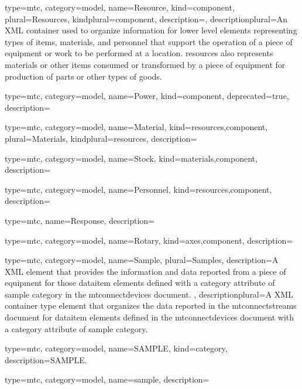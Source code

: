 {
  type=mtc,
  category=model,
  name={Resource},
  kind={component},
  plural={Resources},
  kindplural={component},
  description={},
  descriptionplural={An XML container used to organize information for \gls{lower level} elements representing types of items, materials, and personnel that support the operation of a piece of equipment or work to be performed at a location. \glspl{resource} also represents materials or other items consumed or transformed by a piece of equipment for production of parts or other types of goods.}
}


{
  type=mtc,
  category=model,
  name={Power},
  kind={component},
  deprecated={true},
  description={}
}


{
  type=mtc,
  category=model,
  name={Material},
  kind={resources,component},
  plural={Materials},
  kindplural={resources},
  description={}
}


{
  type=mtc,
  category=model,
  name={Stock},
  kind={materials,component},
  description={}
}


{
  type=mtc,
  category=model,
  name={Personnel},
  kind={resources,component},
  description={}
}


{
  type=mtc,
  name={Response},
  description={}
}



{
  type=mtc,
  category=model,
  name={Rotary},
  kind={axes,component},
  description={}
}


{
  type=mtc,
  category=model,
  name={Sample},
  plural={Samples},
  description={A XML element that provides the information and data reported from a piece of equipment for those \gls{dataitem} elements defined with a \gls{category} attribute of \gls{sample category} in the \glspl{mtconnectdevice} document. },
  descriptionplural={A XML container type element that organizes the data reported in the \glspl{mtconnectstream} document for \gls{dataitem} elements defined in the \glspl{mtconnectdevice} document with a \gls{category} attribute of \gls{sample category}.}
}


{
  type=mtc,
  category=model,
  name={SAMPLE},
  kind={category},
  description={SAMPLE.}
}


{
  type=mtc,
  category=model,
  name={sample},
  description={}
}


